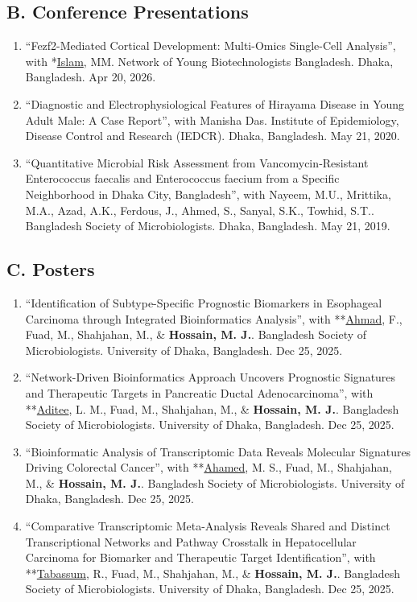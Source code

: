 \documentclass[
  11pt,
  letterpaper,
  DIV=11,
  numbers=noendperiod]{scrartcl}
\providecommand{\tightlist}{%
  \setlength{\itemsep}{0pt}\setlength{\parskip}{0pt}}
\begin{document}
\subsection{B. Conference
Presentations}\label{b.-conference-presentations}

\begin{enumerate}
\def\labelenumi{\arabic{enumi}.}
\tightlist
\item
  ``Fezf2-Mediated Cortical Development: Multi-Omics Single-Cell
  Analysis'', with *\underline{Islam}, MM. Network of Young
  Biotechnologists Bangladesh. Dhaka, Bangladesh. Apr 20, 2026.
\item
  ``Diagnostic and Electrophysiological Features of Hirayama Disease in
  Young Adult Male: A Case Report'', with Manisha Das. Institute of
  Epidemiology, Disease Control and Research (IEDCR). Dhaka, Bangladesh.
  May 21, 2020.
\item
  ``Quantitative Microbial Risk Assessment from Vancomycin‑Resistant
  Enterococcus faecalis and Enterococcus faecium from a Specific
  Neighborhood in Dhaka City, Bangladesh'', with Nayeem, M.U., Mrittika,
  M.A., Azad, A.K., Ferdous, J., Ahmed, S., Sanyal, S.K., Towhid, S.T..
  Bangladesh Society of Microbiologists. Dhaka, Bangladesh. May 21,
  2019.
\end{enumerate}

\subsection{C. Posters}\label{c.-posters}

\begin{enumerate}
\def\labelenumi{\arabic{enumi}.}
\tightlist
\item
  ``Identification of Subtype-Specific Prognostic Biomarkers in
  Esophageal Carcinoma through Integrated Bioinformatics Analysis'',
  with **\underline{Ahmad}, F., Fuad, M., Shahjahan, M., \&
  \textbf{Hossain, M. J.}. Bangladesh Society of Microbiologists.
  University of Dhaka, Bangladesh. Dec 25, 2025.
\item
  ``Network-Driven Bioinformatics Approach Uncovers Prognostic
  Signatures and Therapeutic Targets in Pancreatic Ductal
  Adenocarcinoma'', with **\underline{Aditee}, L. M., Fuad, M.,
  Shahjahan, M., \& \textbf{Hossain, M. J.}. Bangladesh Society of
  Microbiologists. University of Dhaka, Bangladesh. Dec 25, 2025.
\item
  ``Bioinformatic Analysis of Transcriptomic Data Reveals Molecular
  Signatures Driving Colorectal Cancer'', with **\underline{Ahamed}, M.
  S., Fuad, M., Shahjahan, M., \& \textbf{Hossain, M. J.}. Bangladesh
  Society of Microbiologists. University of Dhaka, Bangladesh. Dec 25,
  2025.
\item
  ``Comparative Transcriptomic Meta-Analysis Reveals Shared and Distinct
  Transcriptional Networks and Pathway Crosstalk in Hepatocellular
  Carcinoma for Biomarker and Therapeutic Target Identification'', with
  **\underline{Tabassum}, R., Fuad, M., Shahjahan, M., \&
  \textbf{Hossain, M. J.}. Bangladesh Society of Microbiologists.
  University of Dhaka, Bangladesh. Dec 25, 2025.
\end{enumerate}
\end{document}
